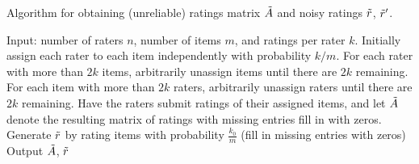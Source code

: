 \begin{algorithm}[t!]
\caption{Algorithm for obtaining (unreliable) ratings matrix $\tilde{A}$ and noisy 
ratings $\tilde{r}$, $\tilde{r}'$.}
\label{alg:create-A}
\begin{algorithmic}[1]
\State Input: number of raters $n$,  number of items $m$, and ratings per rater $k$.
\State Initially assign each rater to each item independently with probability $k/m$.  
\State For each rater with more than $2k$ items, arbitrarily unassign items until 
       there are $2k$ remaining.
\State For each item with more than $2k$
       raters, arbitrarily unassign raters until there are $2k$ remaining.
\State Have the raters submit ratings of their assigned items, and let $\tilde{A}$ 
       denote the resulting matrix of ratings with missing entries fill in with 
       zeros.
\State Generate $\tilde{r}$ by rating items with probability $\frac{k_0}{m}$ (fill in missing entries with zeros)
\State Output $\tilde{A}$, $\tilde{r}$%
\end{algorithmic}
\end{algorithm}


